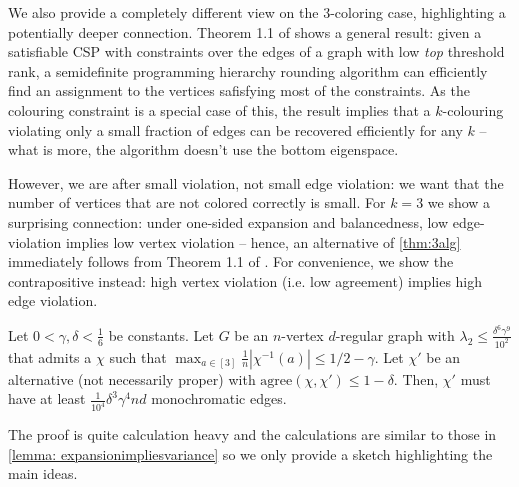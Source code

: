 We also provide a completely different view on the $3$-coloring case, highlighting a potentially deeper connection. Theorem 1.1 of \cite{barak-raghavendra-steurer} shows a general result: given a satisfiable CSP with constraints over the edges of a graph with low \textit{top} threshold rank, a semidefinite programming hierarchy rounding algorithm can efficiently find an assignment to the vertices safisfying most of the constraints. As the colouring constraint is a special case of this, the result implies that a $k$-colouring violating only a small fraction of edges can be recovered efficiently for any $k$ -- what is more, the algorithm doesn't use the bottom eigenspace.

However, we are after small  violation, not small edge violation: we want that the number of vertices that are not colored correctly is small. For $k=3$ we show a surprising connection: under one-sided expansion and balancedness, low edge-violation implies low vertex violation -- hence, an alternative of \cref{thm:3alg} immediately follows from Theorem 1.1 of \cite{barak-raghavendra-steurer}. For convenience, we show the contrapositive instead: high vertex violation (i.e. low agreement) implies high edge violation.



\begin{theorem}\label{thm: vertexvsedgeviolation}
    Let $0<\gamma, \delta<\frac{1}{6}$ be constants. Let $G$ be an $n$-vertex $d$-regular graph with $\lambda_2\leq \frac{\delta^6\gamma^9}{10^2}$ that admits a \tcl $\chi$ such that $\max_{a \in [3]} \frac{1}{n} |\chi^{-1}(a)| \leq 1/2 - \gamma$. Let $\chi'$ be an alternative (not necessarily proper) \tcl with $\text{agree}(\chi, \chi')\leq 1-\delta$. Then, $\chi'$ must have at least $\frac{1}{10^4}\delta^3\gamma^4 nd$ monochromatic edges. 
\end{theorem}

The proof is quite calculation heavy and the calculations are similar to those in \cref{lemma: expansionimpliesvariance} so we only provide a sketch highlighting the main ideas.


